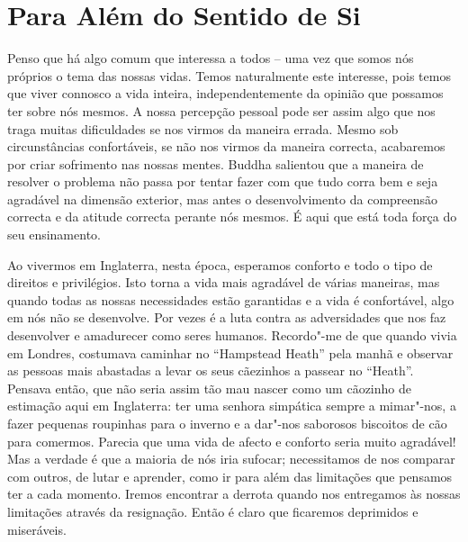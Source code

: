 \chapter{Para Além do Sentido de Si}

Penso que há algo comum que interessa a todos -- uma vez que somos nós
próprios o tema das nossas vidas. Temos naturalmente este interesse,
pois temos que viver connosco a vida inteira, independentemente da
opinião que possamos ter sobre nós mesmos. A nossa percepção pessoal
pode ser assim algo que nos traga muitas dificuldades se nos virmos da
maneira errada. Mesmo sob circunstâncias confortáveis, se não nos virmos
da maneira correcta, acabaremos por criar sofrimento nas nossas mentes.
Buddha salientou que a maneira de resolver o problema não passa por
tentar fazer com que tudo corra bem e seja agradável na dimensão
exterior, mas antes o desenvolvimento da compreensão correcta e da
atitude correcta perante nós mesmos. É aqui que está toda força do seu
ensinamento.

Ao vivermos em Inglaterra, nesta época, esperamos conforto e todo o tipo
de direitos e privilégios. Isto torna a vida mais agradável de várias
maneiras, mas quando todas as nossas necessidades estão garantidas e a
vida é confortável, algo em nós não se desenvolve. Por vezes é a luta
contra as adversidades que nos faz desenvolver e amadurecer como seres
humanos. Recordo"-me de que quando vivia em Londres, costumava caminhar
no ``Hampstead Heath'' pela manhã e observar as pessoas mais abastadas a
levar os seus cãezinhos a passear no ``Heath''. Pensava então, que não
seria assim tão mau nascer como um cãozinho de estimação aqui em
Inglaterra: ter uma senhora simpática sempre a mimar"-nos, a fazer
pequenas roupinhas para o inverno e a dar"-nos saborosos biscoitos de cão
para comermos. Parecia que uma vida de afecto e conforto seria muito
agradável! Mas a verdade é que a maioria de nós iria sufocar;
necessitamos de nos comparar com outros, de lutar e aprender, como ir
para além das limitações que pensamos ter a cada momento. Iremos
encontrar a derrota quando nos entregamos às nossas limitações através
da resignação. Então é claro que ficaremos deprimidos e miseráveis.

